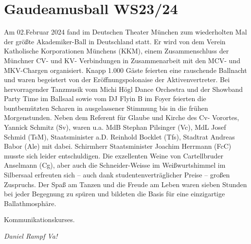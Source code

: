 \section{Gaudeamusball WS23/24}


\begin{multicols}{2}
Am 02.Februar 2024 fand im Deutschen Theater München zum wiederholten Mal der größte Akademiker-Ball in Deutschland statt. Er wird von dem Verein Katholische Korporationen Münchens (KKM), einem Zusammenschluss der Münchner CV- und KV- Verbindungen in Zusammenarbeit mit den MCV- und MKV-Chargen organisiert. Knapp 1.000 Gäste feierten eine rauschende Ballnacht und waren begeistert von der Eröffnungspolonaise der Aktivenvertreter. Bei hervorragender Tanzmusik vom Michi Högl Dance Orchestra und der Showband Party Time im Ballsaal sowie vom DJ Flyin B im Foyer feierten die buntbemützten Scharen in ausgelassener Stimmung bis in die frühen Morgenstunden. Neben dem Referent für Glaube und Kirche des Cv- Vorortes, Yannick Schmitz (Sv), waren u.a. MdB Stephan Pilsinger (Vc), MdL Josef Schmid (TsM), Staatsminister a.D. Reinhold Bocklet (Tfs), Stadtrat Andreas Babor (Ale) mit dabei. Schirmherr Staatsminister Joachim Herrmann (FcC) musste sich leider entschuldigen. Die exzellenten Weine von Cartellbruder Anselmann (Cg), aber auch die Schneider-Weisse im Weißwurtshimmel im Silbersaal erfreuten sich – auch dank studentenverträglicher Preise – großen Zuspruchs. Der Spaß am Tanzen und die Freude am Leben waren sieben Stunden bei jeder Begegnung zu spüren und bildeten die Basis für eine einzigartige Ballathmosphäre.
\end{multicols}

\begin{multicols}{2}
 Kommunikationskurses.
	\begin{flushright}
		\hfill\emph{Daniel Rampf Va! }
	\end{flushright}
\end{multicols}


%
